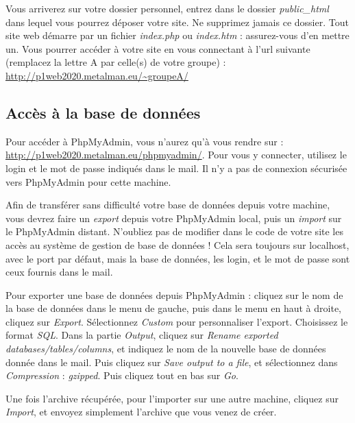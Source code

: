 \bigskip

\noindent Vous arriverez sur votre dossier personnel, entrez dans le dossier \textit{public\_html} dans lequel vous pourrez déposer votre site.
Ne supprimez jamais ce dossier.
Tout site web démarre par un fichier \textit{index.php} ou \textit{index.htm} : assurez-vous d'en mettre un.
Vous pourrer accéder à votre site en vous connectant à l'url suivante (remplacez la lettre A par celle(s) de votre groupe) : \url{http://p1web2020.metalman.eu/~groupeA/}

\bigskip

\subsection{Accès à la base de données}

\noindent Pour accéder à PhpMyAdmin, vous n'aurez qu'à vous rendre sur : \url{http://p1web2020.metalman.eu/phpmyadmin/}.
Pour vous y connecter, utilisez le login et le mot de passe indiqués dans le mail.
Il n'y a pas de connexion sécurisée vers PhpMyAdmin pour cette machine.

\bigskip

\noindent Afin de transférer sans difficulté votre base de données depuis votre machine, vous devrez faire un \textit{export} depuis votre PhpMyAdmin local, puis un \textit{import} sur le PhpMyAdmin distant.
N'oubliez pas de modifier dans le code de votre site les accès au système de gestion de base de données !
Cela sera toujours sur localhost, avec le port par défaut, mais la base de données, les login, et le mot de passe sont ceux fournis dans le mail.

\bigskip

\noindent Pour exporter une base de données depuis PhpMyAdmin : cliquez sur le nom de la base de données dans le menu de gauche, puis dans le menu en haut à droite, cliquez sur \textit{Export}.
Sélectionnez \textit{Custom} pour personnaliser l'export.
Choisissez le format \textit{SQL}.
Dans la partie \textit{Output}, cliquez sur \textit{Rename exported databases/tables/columns}, et indiquez le nom de la nouvelle base de données donnée dans le mail.
Puis cliquez sur \textit{Save output to a file}, et sélectionnez dans \textit{Compression} : \textit{gzipped}.
Puis cliquez tout en bas sur \textit{Go}.

\bigskip

\noindent Une fois l'archive récupérée, pour l'importer sur une autre machine, cliquez sur \textit{Import}, et envoyez simplement l'archive que vous venez de créer.
